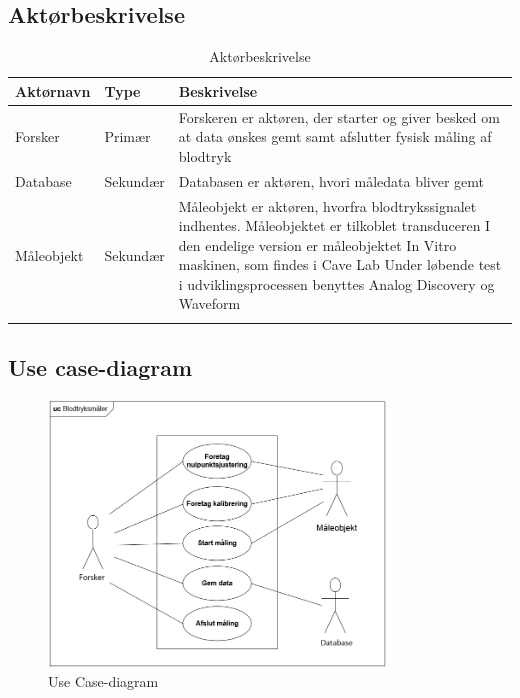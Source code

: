 \subsection{Aktørbeskrivelse}

\begin{table}[H]
\begin{tabularx}{\textwidth}{l l X}
     Aktørnavn	&	Type		&	Beskrivelse \\ \midrule
     Forsker   	& 	Primær  	& 	Forskeren er aktøren, der starter og giver besked om at data ønskes gemt samt afslutter fysisk måling af blodtryk \\ 			  \addlinespace[2mm]
     Database	&	Sekundær	&	Databasen er aktøren, hvori måledata bliver gemt \\   \addlinespace[2mm]
     Måleobjekt	&	Sekundær	&	Måleobjekt er aktøren, hvorfra blodtrykssignalet indhentes. Måleobjektet er tilkoblet transduceren
     I den endelige version er måleobjektet In Vitro maskinen, som findes i Cave Lab
     Under løbende test i udviklingsprocessen benyttes Analog Discovery og Waveform \\   \addlinespace[2mm]
     
   
     \bottomrule                                                                                                                   
    \end{tabularx}
    \caption {Aktørbeskrivelse}
    \label{tab:aktoerbeskrivelse}
	
\end{table}

\subsection{Use case-diagram}

\begin{figure}[H]
	\centering
	\includegraphics[width=0.8\textwidth]{Figurer/UseCasediagram}
	\caption{Use Case-diagram}
	\label{fig:Use Cases}
\end{figure}

